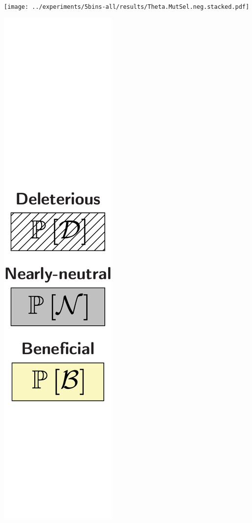 \documentclass{article}
\begin{document}
\begin{center}
\begin{minipage}{0.09\linewidth}
        \end{minipage}
        \begin{minipage}{0.9\linewidth}
            \texttt{[image: ../experiments/5bins-all/results/Theta.MutSel.neg.stacked.pdf]} \\
        \end{minipage}
        \begin{minipage}{0.09\linewidth}
            \includegraphics[width=\linewidth, page=1]{artworks/legend.polycat}

\end{minipage}
\end{center}
\end{document}
